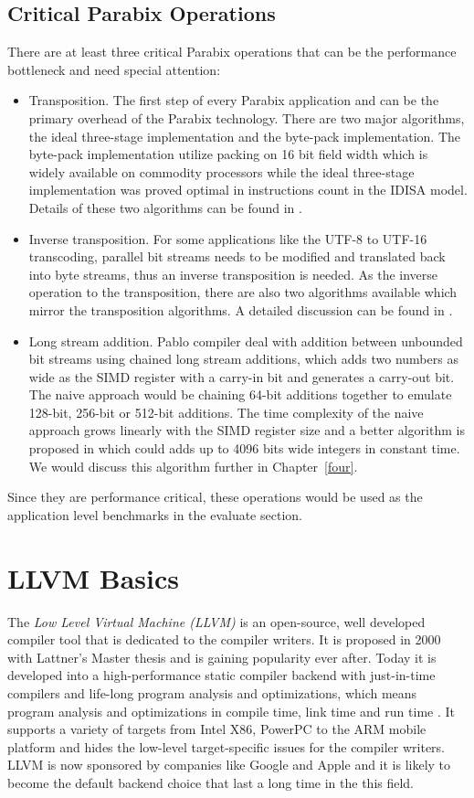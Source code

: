 \subsection{Critical Parabix Operations}
There are at least three critical Parabix operations that can be the performance bottleneck and need special attention:
\begin{itemize}
    \item Transposition. The first step of every Parabix application and can be the primary overhead of the Parabix technology. There are two major algorithms, the ideal three-stage implementation and the byte-pack implementation. The byte-pack implementation utilize packing on 16 bit field width which is widely available on commodity processors while the ideal three-stage implementation was proved optimal in instructions count in the IDISA model. Details of these two algorithms can be found in \cite{inductive_doubling_principle}.
    \item Inverse transposition. For some applications like the UTF-8 to UTF-16 transcoding, parallel bit streams needs to be modified and translated back into byte streams, thus an inverse transposition is needed. As the inverse operation to the transposition, there are also two algorithms available which mirror the transposition algorithms. A detailed discussion can be found in \cite{rob_u8u16}.
    \item Long stream addition. Pablo compiler deal with addition between unbounded bit streams using chained long stream additions, which adds two numbers as wide as the SIMD register with a carry-in bit and generates a carry-out bit. The naive approach would be chaining 64-bit additions together to emulate 128-bit, 256-bit or 512-bit additions. The time complexity of the naive approach grows linearly with the SIMD register size and a better algorithm is proposed in \cite{rob_regex} which could adds up to 4096 bits wide integers in constant time. We would discuss this algorithm further in Chapter~\ref{four}.
\end{itemize}

Since they are performance critical, these operations would be used as the application level benchmarks in the evaluate section.

\section{LLVM Basics}
The \textit{Low Level Virtual Machine (LLVM)} is an open-source, well developed compiler tool that is dedicated to the compiler writers. It is proposed in 2000 with Lattner's Master thesis \cite{chris_msthesis} and is gaining popularity ever after. Today it is developed into a high-performance static compiler backend with just-in-time compilers and life-long program analysis and optimizations, which means program analysis and optimizations in compile time, link time and run time \cite{llvm_ghc, llvm_cgo04}. It supports a variety of targets from Intel X86, PowerPC to the ARM mobile platform and hides the low-level target-specific issues for the compiler writers. LLVM is now sponsored by companies like Google and Apple and it is likely to become the default backend choice that last a long time in the this field.

